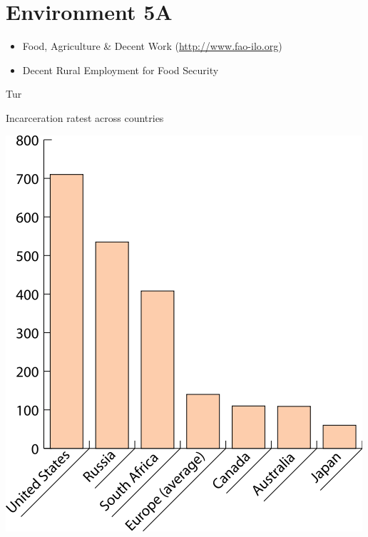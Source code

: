 \section{Environment 5A}

\lipsum[1]

\begin{freading}
  \begin{itemize}
  \item Food, Agriculture \& Decent Work (\url{http://www.fao-ilo.org})
  \item Decent Rural Employment for  Food Security 
  \end{itemize}
\end{freading}

\begin{map}{T}{ur}
\caption{Incarceration ratest across countries}
\label{chart:incarceration}
\includegraphics[width=\chartwidth,height=\chartheight]{incarceration}  
\end{map}

